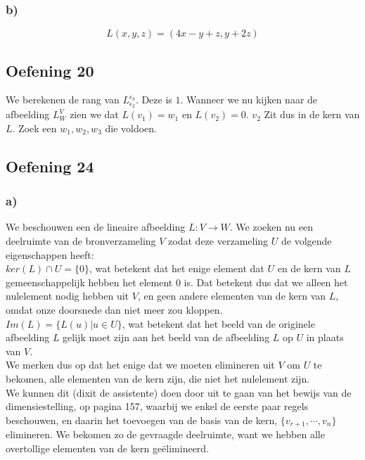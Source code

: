 \documentclass[lineaire_algebra_oplossingen.tex]{subfiles}
\begin{document}
\subsubsection*{b)}
\[
L(x,y,z) = (4x-y+z,y+2z)
\]

\subsection{Oefening 20}
We berekenen de rang van $L_{\epsilon_2}^{\epsilon_3}$. Deze is $1$.
Wanneer we nu kijken naar de afbeelding $L_{W}^V$ zien we dat $L(v_1) = w_1$ en $L(v_2) = 0$. $v_2$ Zit dus in de kern van $L$.
Zoek een $w_1,w_2,w_3$ die voldoen.


\subsection{Oefening 24}
\subsubsection*{a)}
We beschouwen een de lineaire afbeelding $L:V\rightarrow W$. We zoeken nu een deelruimte van de bronverzameling $V$ zodat deze verzameling $U$ de volgende eigenschappen heeft:\\
$ker(L)\cap U = \{0\}$, wat betekent dat het enige element dat $U$ en de kern van $L$ gemeenschappelijk hebben het element $0$ is. Dat betekent dus dat we alleen het nulelement nodig hebben uit $V$, en geen andere elementen van de kern van $L$, omdat onze doorsnede dan niet meer zou kloppen.\\
$Im(L) = \{L(u)| u\in U\}$, wat betekent dat het beeld van de originele afbeelding $L$ gelijk moet zijn aan het beeld van de afbeelding $L$ op $U$ in plaats van $V$.\\
We merken dus op dat het enige dat we moeten elimineren uit $V$ om $U$ te bekomen, alle elementen van de kern zijn, die niet het nulelement zijn.\\
We kunnen dit (dixit de assistente) doen door uit te gaan van het bewijs van de dimensiestelling, op pagina 157, waarbij we enkel de eerste paar regels beschouwen, en daarin het toevoegen van de basis van de kern, $\{v_{r+1},\cdots,v_n\}$ elimineren. We bekomen zo de gevraagde deelruimte, want we hebben alle overtollige elementen van de kern ge\"elimineerd.
\end{document}
